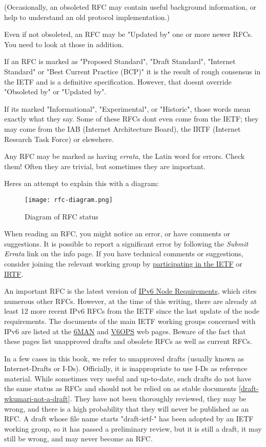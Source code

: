 \documentclass[
]{article}
\begin{document}
(Occasionally, an obsoleted RFC may contain useful background
information, or help to understand an old protocol implementation.)

Even if not obsoleted, an RFC may be "Updated by" one or more newer
RFCs. You need to look at those in addition.

If an RFC is marked as "Proposed Standard", "Draft Standard", "Internet
Standard" or "Best Current Practice (BCP)" it is the result of rough
consensus in the IETF and is a definitive specification. However, that
doesn\textquotesingle t override "Obsoleted by" or "Updated by".

If it\textquotesingle s marked "Informational", "Experimental", or
"Historic", those words mean exactly what they say. Some of these RFCs
don\textquotesingle t even come from the IETF; they may come from the
IAB (Internet Architecture Board), the IRTF (Internet Research Task
Force) or elswehere.

Any RFC may be marked as having \emph{errata}, the Latin word for
errors. Check them! Often they are trivial, but sometimes they are
important.

Here\textquotesingle s an attempt to explain this with a diagram:

\begin{figure}
\centering
\texttt{[image: rfc-diagram.png]}
\caption{Diagram of RFC status}
\end{figure}

When reading an RFC, you might notice an error, or have comments or
suggestions. It is possible to report a significant error by following
the \emph{Submit Errata} link on the info page. If you have technical
comments or suggestions, consider joining the relevant working group by
\href{https://www.ietf.org/participate/}{participating in the IETF} or
\href{https://www.irtf.org/}{IRTF}.

An important RFC is the latest version of
\href{https://www.rfc-editor.org/info/bcp220}{IPv6 Node Requirements},
which cites numerous other RFCs. However, at the time of this writing,
there are already at least 12 more recent IPv6 RFCs from the IETF since
the last update of the node requirements. The documents of the main IETF
working groups concerned with IPv6 are listed at the
\href{https://datatracker.ietf.org/wg/6man/documents/}{6MAN} and
\href{https://datatracker.ietf.org/wg/v6ops/documents/}{V6OPS} web
pages. Beware of the fact that these pages list unapproved drafts and
obsolete RFCs as well as current RFCs.

In a few cases in this book, we refer to unapproved drafts (usually
known as Internet-Drafts or I-Ds). Officially, it is inappropriate to
use I-Ds as reference material. While sometimes very useful and
up-to-date, such drafts do not have the same status as RFCs and should
not be relied on as stable documents
{[}\href{https://datatracker.ietf.org/doc/draft-wkumari-not-a-draft/}{draft-wkumari-not-a-draft}{]}.
They have not been thoroughly reviewed, they may be wrong, and there is
a high probability that they will never be published as an RFC. A draft
whose file name starts "draft-ietf-" has been adopted by an IETF working
group, so it has passed a preliminary review, but it is still a draft,
it may still be wrong, and may never become an RFC.
\end{document}
